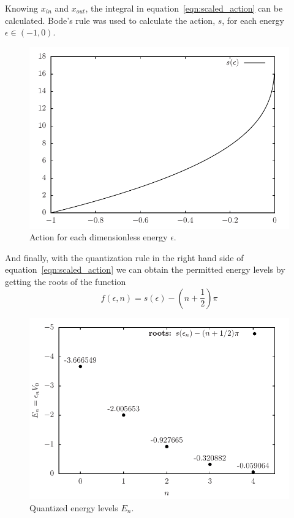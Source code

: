 \documentclass[11pt]{article}
\begin{document}
Knowing $x_{in}$ and $x_{out}$, the integral in equation~\ref{eqn:scaled_action} can be calculated. Bode's rule was used to calculate the action, $s$, for each energy $\epsilon\in(-1,0)$.
\begin{figure}[H]
  \centering
  \includegraphics[width=\linewidth]{action-LJ}
  \caption{Action for each dimensionless energy $\epsilon$.}
\label{fig:action-Lj}
\end{figure}

And finally, with the quantization rule in the right hand side of equation~\ref{eqn:scaled_action} we can obtain the permitted energy levels by getting the roots of the function
\begin{equation*}
  f(\epsilon, n) = s(\epsilon) - \left(n+\frac{1}{2}\right)\pi
\end{equation*}
\begin{figure}[H]
  \centering
  \includegraphics[width=\linewidth]{quantizedEnergy-LJ}
  \caption{Quantized energy levels $E_n$.}
\label{fig:energy-LJ}
\end{figure}
\end{document}
